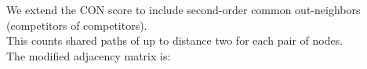 \documentclass[preview]{standalone}
\begin{document}
We extend the CON score to include second-order common out-neighbors (competitors of competitors).\\This counts shared paths of up to distance two for each pair of nodes.\\The modified adjacency matrix is:\\
\end{document}
